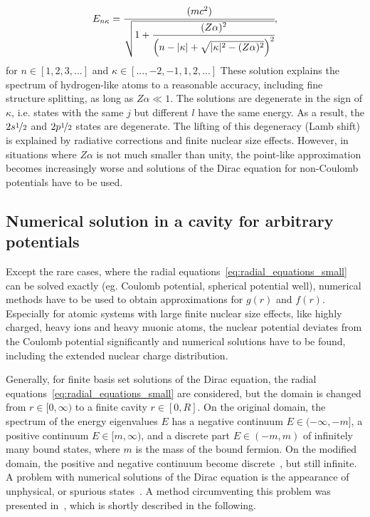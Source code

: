 \begin{equation}
\label{eq:finestructure_formula}
E_{n\kappa}=\cfrac{(mc^2)}{\sqrt{1+\cfrac{(Z\alpha)^2}{\left( n-|\kappa|+\sqrt{|\kappa|^2-(Z\alpha)^2} \right)^2}}},
\end{equation}
for $n\in [1,2,3,...]$ and $\kappa \in [...,{-}{2},{-}{1},1,2,...]$
These solution explains the spectrum of hydrogen-like atoms to a reasonable accuracy, including fine structure splitting, as long as $Z\alpha\ll 1$. The solutions are degenerate in the sign of $\kappa$, i.e. states with the same $j$ but different $l$ have the same energy. As a result, the $2s\nicefrac{1}{2}$ and $2p\nicefrac{1}{2}$ states are degenerate. The lifting of this degeneracy (Lamb shift) is explained by radiative corrections and finite nuclear size effects. However, in situations where $Z\alpha$ is not much smaller than unity, the point-like approximation becomes increasingly worse and solutions of the Dirac equation for non-Coulomb potentials have to be used.



\subsection{Numerical solution in a cavity for arbitrary potentials}
Except the rare cases, where the radial equations~\eqref{eq:radial_equations_small} can be solved exactly (eg. Coulomb potential, spherical potential well), numerical methods have to be used to obtain approximations for $g(r)$ and $f(r)$. Especially for atomic systems with large finite nuclear size effects, like highly charged, heavy ions and heavy muonic atoms, the nuclear potential deviates from the Coulomb potential significantly and numerical solutions have to be found, including the extended nuclear charge distribution.
 
Generally, for finite basis set solutions of the Dirac equation, the radial equations~\eqref{eq:radial_equations_small} are considered, but the domain is changed from $r\in[0,\infty)$ to a finite cavity $r\in [0,R]$. On the original domain, the spectrum of the energy eigenvalues $E$ has a negative continuum $E\in (-\infty,-m]$, a positive continuum $E\in [m,\infty)$, and a discrete part $E\in (-m,m)$ of infinitely many bound states, where $m$ is the mass of the bound fermion. On the modified domain, the positive and negative continuum become discrete~\cite{johnson1988}, but still infinite.
A problem with numerical solutions of the Dirac equation is the appearance of unphysical, or spurious states~\cite{johnson1988, drake1981}. A method circumventing this problem was presented in~\cite{Shabaev2004}, which is shortly described in the following.

